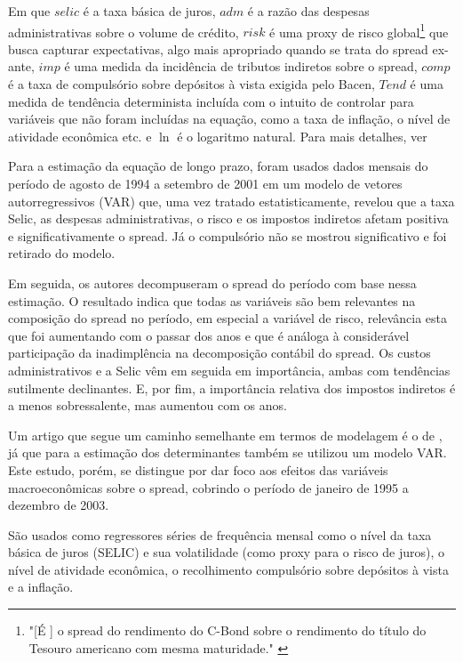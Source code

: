 \documentclass[a4paper,
               article,
               12pt,
               openany,
               oneside,
               english,
               brazil]{abntex2}
\numberwithin{equation}{section}
\begin{document}
    Em que $selic$ é a taxa básica de juros, $adm$ é a razão das despesas administrativas sobre o volume de crédito, $risk$ é uma proxy de risco global\footnote{"[É ] o spread do rendimento do C-Bond sobre o rendimento do título do Tesouro americano com mesma maturidade." \cite[p.~10]{nakane02}} que busca capturar expectativas, algo mais apropriado quando se trata do spread ex-ante, $imp$ é uma medida da incidência de tributos indiretos sobre o spread, $comp$ é a taxa de compulsório sobre depósitos à vista exigida pelo Bacen,  $Tend$ é uma medida de tendência determinista incluída com o intuito de controlar para variáveis que não foram incluídas na equação, como a taxa de inflação, o nível de atividade econômica etc. e $\ln$ é o logaritmo natural.  Para mais detalhes, ver 

    Para a estimação da equação de longo prazo, foram usados dados mensais do período de agosto de 1994 a setembro de 2001 em um modelo de vetores autorregressivos (VAR) que, uma vez tratado estatisticamente, revelou que a taxa Selic, as despesas administrativas, o risco e os impostos indiretos afetam positiva e significativamente o spread. Já o compulsório não se mostrou significativo e foi retirado do modelo.

    Em seguida, os autores decompuseram o spread do período com base nessa estimação. O resultado indica que todas as variáveis são bem relevantes na composição do spread no período, em especial a variável de risco, relevância esta que foi aumentando com o passar dos anos e que é análoga à considerável participação da inadimplência na decomposição contábil do spread. Os custos administrativos e a Selic vêm em seguida em importância, ambas com tendências sutilmente declinantes. E, por fim, a importância relativa dos impostos indiretos é a menos sobressalente, mas aumentou com os anos. 

    Um artigo que segue um caminho semelhante em termos de modelagem é o de , já que para a estimação dos determinantes também se utilizou um modelo VAR. Este estudo, porém, se distingue por dar foco aos efeitos das variáveis macroeconômicas sobre o spread, cobrindo o período de janeiro de 1995 a dezembro de 2003. 
    
    São usados como regressores séries de frequência mensal como o nível da taxa básica de juros (SELIC) e sua volatilidade (como proxy para o risco de juros), o nível de atividade econômica, o recolhimento compulsório sobre depósitos à vista e a inflação.
\end{document}
